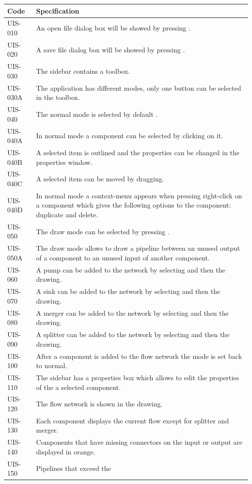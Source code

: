 \begin{tabularx}{\textwidth}{|p{2cm}X|}\hline
	Code & Specification \\\hline
	UIS-010 & An open file dialog box will be showed by pressing \faicon{folder-open}. \\\hline
	UIS-020 & A save file dialog box will be showed by pressing \faicon{floppy-o}. \\\hline
	UIS-030 & The sidebar contains a toolbox. \\\hline
	UIS-030A & The application has different modes, only one button can be selected in the toolbox.  \\\hline
	UIS-040 & The normal mode is selected by default \faicon{mouse-pointer}. \\\hline
	UIS-040A & In normal mode a component can be selected by clicking on it. \\\hline
	UIS-040B & A selected item is outlined and the properties can be changed in the properties window. \\\hline
	UIS-040C & A selected item can be moved by dragging. \\\hline
	UIS-040D & In normal mode a context-menu appears when pressing right-click on a component which gives the following options to the component: duplicate and delete. \\\hline
	UIS-050 & The draw mode can be selected by pressing \faicon{pencil}. \\\hline
	UIS-050A & The draw mode allows to draw a pipeline between an unused output of a component to an unused input of another component. \\\hline
	UIS-060 & A pump can be added to the network by selecting \faicon{sign-out} and then the drawing. \\\hline
	UIS-070 & A sink can be added to the network by selecting \faicon{sign-in} and then the drawing. \\\hline
	UIS-080 & A merger can be added to the network by selecting \faicon{chevron-right} and then the drawing. \\\hline
	UIS-090 & A splitter can be added to the network by selecting \faicon{chevron-left} and then the drawing. \\\hline
	UIS-100 & After a component is added to the flow network the mode is set back to normal. \\\hline
	UIS-110 & The sidebar has a properties box which allows to edit the properties of the a selected component. \\\hline
	UIS-120 & The flow network is shown in the drawing. \\\hline
	UIS-130 & Each component displays the current flow except for splitter and merger. \\\hline
	UIS-140 & Components that have missing connectors on the input or output are displayed in orange. \\\hline
	UIS-150 & Pipelines that exceed the \\\hline
\end{tabularx}